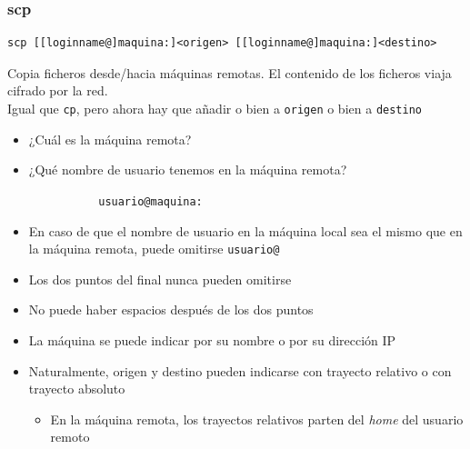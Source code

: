 \documentclass[ucs]{beamer}
\begin{document}
\begin{frame}[shrink=10,fragile]
\frametitle{scp}

\begin{verbatim}
scp [[loginname@]maquina:]<origen> [[loginname@]maquina:]<destino> 
\end{verbatim}
  Copia ficheros desde/hacia máquinas remotas. El
    contenido de los ficheros viaja cifrado por la red.\\

    Igual que \verb|cp|, pero ahora hay que añadir o bien a
    \verb|origen| o bien a \verb|destino| 
\begin{itemize}
\item
¿Cuál es la máquina remota?
\item
¿Qué nombre de usuario tenemos en la máquina remota?
\end{itemize}

\verb|              usuario@maquina:|

\begin{itemize}
\item En caso de que el nombre de usuario en la máquina
local sea el mismo que en la máquina remota, puede omitirse
\verb|usuario@|
\item
Los dos puntos del final nunca pueden omitirse
\item
No puede haber espacios después de los dos puntos
\item
La máquina se puede indicar por su nombre o por su dirección IP
\item
Naturalmente, origen y destino pueden indicarse con trayecto relativo o 
con trayecto absoluto
 
\begin{itemize}
\item
En la máquina remota, los trayectos relativos parten del \emph{home}
del usuario remoto
\end{itemize}
\end{itemize}



\end{frame}
\end{document}
